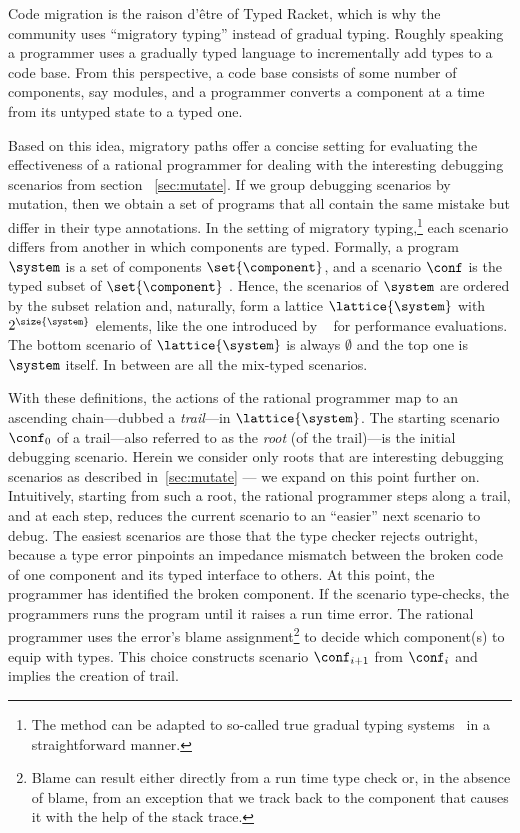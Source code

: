 Code migration is the raison d'\^etre of Typed Racket, which is why the community
uses ``migratory typing'' instead of gradual typing. Roughly speaking a
programmer uses a gradually typed language to incrementally add types to a code
base. From this perspective, a code base consists of some number of components,
say modules, and a programmer converts a component at a time from its untyped
state to a typed one. 

Based on this idea, migratory paths offer a concise setting for
evaluating the effectiveness of a rational programmer for dealing with the
interesting debugging scenarios  from section ~\ref{sec:mutate}.
If we group debugging scenarios by mutation, then we obtain a set 
of programs that all contain the same mistake but differ in their type
annotations.  In the setting of migratory typing,\footnote{The method can be adapted to
so-called true gradual typing systems~\cite{svcb-snapl-2015} in a
straightforward manner.} each scenario differs from another in which
components are typed. Formally, a program $\system$ is a set of
components $\set{\component}$, and a scenario $\conf$ is the typed subset of
$\set{\component}$ . Hence, the scenarios of $\system$ are ordered by the
subset relation and, naturally,  form a lattice $\lattice{\system}$ with
$2^{\size{\system}}$ elements, like
the one introduced by ~\citet{tfgnvf-popl-2016} for performance
evaluations. The bottom scenario of
$\lattice{\system}$ is always $\emptyset$ and the top one is $\system$
itself. In between are all the mix-typed scenarios.


With these definitions, the actions of the rational programmer map to an
ascending chain---dubbed a \emph{trail}---in $\lattice{\system}$.  The
starting scenario $\conf_0$ of a trail---also referred to as the
\emph{root} (of the trail)---is the initial debugging scenario.  Herein we
consider only roots that are interesting debugging scenarios as described
in~\ref{sec:mutate} --- we expand on this point further on.  Intuitively,
starting from such a root, the rational programmer  steps along a trail,
and at each step, reduces the current scenario to an ``easier'' next
scenario to debug.  The easiest scenarios are those that the type checker
rejects outright, because a type error pinpoints an impedance mismatch
between the broken code of one component and its typed interface to
others. At this point, the programmer has identified the broken component.
If the scenario type-checks, the programmers runs the program until it
raises a run time error.  The rational programmer uses the error's blame
assignment\footnote{Blame can result either directly from a run time type
check or, in the absence of blame, from an exception that we track back to
the component that causes it with the help of the stack trace.} to decide
which component(s) to equip with types. This choice constructs scenario
$\conf_{i+1}$ from $\conf_{i}$ and implies the creation of trail.  

